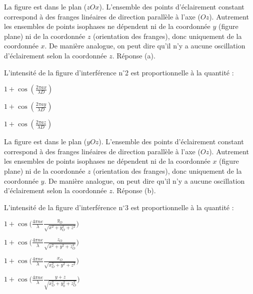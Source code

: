 \begin{corrige}
	La figure est dans le plan ($zOx$). L'ensemble des points d'éclairement constant correspond à des franges linéaires de direction parallèle à l'axe ($Oz$). Autrement les ensembles de points isophases ne dépendent ni de la coordonnée $y$ (figure plane) ni de la coordonnée $z$ (orientation des franges), donc uniquement de la coordonnée $x$. De manière analogue, on peut dire qu'il n'y a aucune oscillation d'éclairement selon la coordonnée $z$. Réponse (a).
\end{corrige}


\begin{enonce}
	L'intensité de la figure d'interférence n$^\circ$2 est proportionnelle à la quantité : 
	
	\begin{listeQCM3Colonnes}
		\item $1+ \cos \left(\frac{2\pi a x}{\lambda D} \right)$
		\item $1+ \cos \left(\frac{2\pi a y}{\lambda D} \right)$
		\item $1+ \cos \left(\frac{2\pi a z}{\lambda D} \right)$
	\end{listeQCM3Colonnes}

\end{enonce}

\reponse{\reponseB{}}

\begin{corrige}
	La figure est dans le plan ($yOz$). L'ensemble des points d'éclairement constant correspond à des franges linéaires de direction parallèle à l'axe ($Oz$). Autrement les ensembles de points isophases ne dépendent ni de la coordonnée $x$ (figure plane) ni de la coordonnée $z$ (orientation des franges), donc uniquement de la coordonnée $y$. De manière analogue, on peut dire qu'il n'y a aucune oscillation d'éclairement selon la coordonnée $z$. Réponse (b).
\end{corrige}


\begin{enonce}
	L'intensité de la figure d'interférence n$^\circ$3 est proportionnelle à la quantité : 
	
	\begin{listeQCM2Colonnes}
	\item $1+ \cos \big( \frac{4\pi n e}{\lambda } \frac{y_O}{\sqrt{x^2+y_O^2+z^2}} \big)$
	\item $1+ \cos \big( \frac{4\pi n e}{\lambda }\frac{z_O}{\sqrt{x^2+y^2 +z_O^2}} \big)$
	\item $1+ \cos \big( \frac{4\pi n e}{\lambda } \frac{x_O}{\sqrt{x_O^2+y^2 +z^2}} \big)$
	\item $1+ \cos \big( \frac{4\pi n e}{\lambda }\frac{y + z}{\sqrt{x_O^2+y_0^2 +z_O^2}} \big)$
	\end{listeQCM2Colonnes}

\end{enonce}

